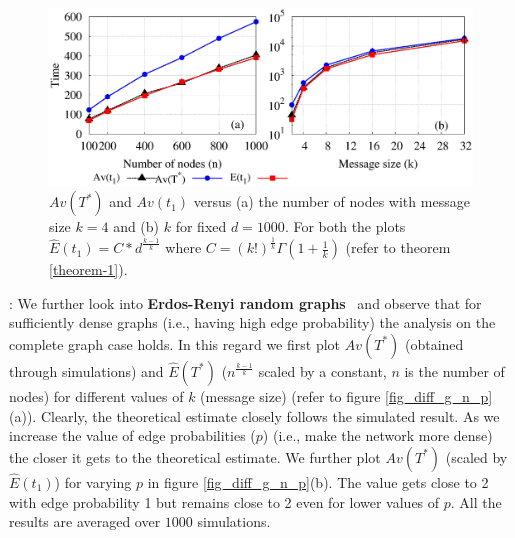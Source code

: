  \begin{figure}[htbp] 
 \centering
 \includegraphics[scale=0.4]{./texfiles/Chapter_3/epl/figs1/plot_var_n_k_complete.eps}
 
 \caption{$Av(T^*)$ and $Av(t_1)$ versus (a) the number of nodes with message size $k=4$ and (b) $k$ for fixed $d=1000$.
  For both the plots $\hat E(t_1) = C \ast d^{\frac{k-1}{k}}$ where $C = (k!)^{\frac{1}{k}}\Gamma\left(1+\frac{1}{k}\right)$ (refer to theorem \ref{theorem-1}).}
 \label{segSizeVsDelay_nrTrans_varyN_Mall_push_pull}
 \end{figure}



: We further look into {\bf Erdos-Renyi random graphs}~\cite{erdos1959random} and observe that for sufficiently 
dense graphs (i.e., having high edge probability) the analysis on the complete graph case holds.  
In this regard we first plot $Av(T^{\ast})$ (obtained through simulations) and $\hat{E}(T^{\ast})$ ($n^{\frac{k-1}{k}}$ scaled by a constant, $n$ is the number of nodes) for 
different values of $k$ (message size) (refer to figure \ref{fig_diff_g_n_p}(a)). 
Clearly, the theoretical estimate closely follows the simulated result. {As we increase the value of edge probabilities ($p$) (i.e., make the network more dense)
 the closer it gets to the theoretical estimate.}
We further plot $Av(T^{\ast})$ (scaled by $\hat{E}(t_{1})$) for varying $p$ in figure \ref{fig_diff_g_n_p}(b). 
The value gets close to 2 with edge probability 1 but remains close to 2 even for lower values of $p$. 
All the results are averaged over $1000$ simulations.



